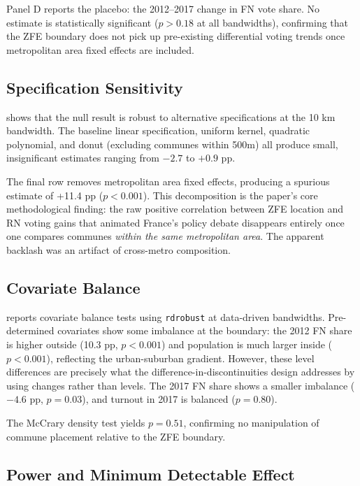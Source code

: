 \documentclass[12pt]{article}
\begin{document}
Panel D reports the placebo: the 2012--2017 change in FN vote share. No estimate is statistically significant ($p > 0.18$ at all bandwidths), confirming that the ZFE boundary does not pick up pre-existing differential voting trends once metropolitan area fixed effects are included.

\subsection{Specification Sensitivity}



 shows that the null result is robust to alternative specifications at the 10 km bandwidth. The baseline linear specification, uniform kernel, quadratic polynomial, and donut (excluding communes within 500m) all produce small, insignificant estimates ranging from $-2.7$ to $+0.9$ pp.

The final row removes metropolitan area fixed effects, producing a spurious estimate of +11.4 pp ($p < 0.001$). This decomposition is the paper's core methodological finding: the raw positive correlation between ZFE location and RN voting gains that animated France's policy debate disappears entirely once one compares communes \textit{within the same metropolitan area}. The apparent backlash was an artifact of cross-metro composition.

\subsection{Covariate Balance}



 reports covariate balance tests using \texttt{rdrobust} at data-driven bandwidths. Pre-determined covariates show some imbalance at the boundary: the 2012 FN share is higher outside (10.3 pp, $p < 0.001$) and population is much larger inside ($p < 0.001$), reflecting the urban-suburban gradient. However, these level differences are precisely what the difference-in-discontinuities design addresses by using changes rather than levels. The 2017 FN share shows a smaller imbalance ($-4.6$ pp, $p = 0.03$), and turnout in 2017 is balanced ($p = 0.80$).

The McCrary density test yields $p = 0.51$, confirming no manipulation of commune placement relative to the ZFE boundary.

\subsection{Power and Minimum Detectable Effect}
\end{document}
